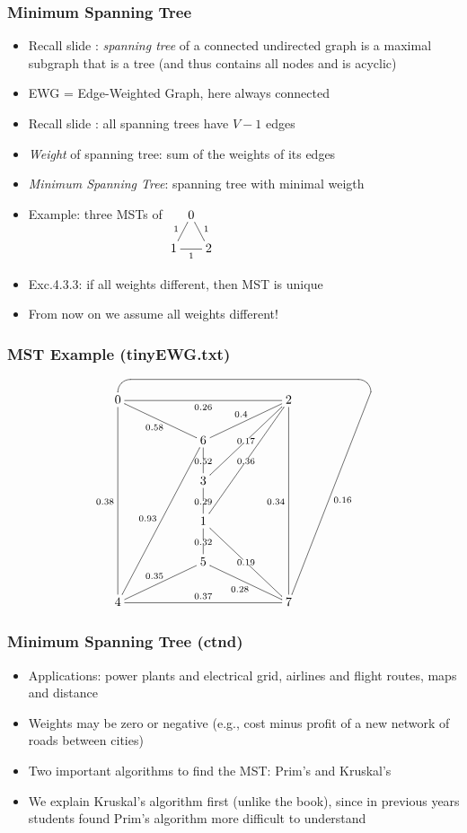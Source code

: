 \documentclass[handout]{beamer}
\begin{document}
\begin{frame}
    \frametitle{Minimum Spanning Tree}

\begin{itemize}[<+->]
\item Recall slide \hyperlink{tree_forest}{\color{red}{\pageref{tree_forest}}}: 
\emph{spanning tree} of a connected undirected graph
is a maximal subgraph that is a tree (and thus contains all nodes and is acyclic)
\item EWG = Edge-Weighted Graph, here always connected
\item Recall slide \hyperlink{tree_characteristics}{\color{red}{\pageref{tree_characteristics}}}:
all spanning trees have $V-1$ edges
\item \emph{Weight} of spanning tree: sum of the weights of its edges
\item \emph{Minimum Spanning Tree}: spanning tree with minimal weigth
\item Example: three MSTs of $\xymatrix@R=.5cm@C=.1cm{
&0 \ar@{-}[ld]_1\ar@{-}[rd]^1&\\
1 \ar@{-}[rr]_1&&2}$
\item Exc.4.3.3: if all weights different, then MST is unique
\item From now on we assume all weights different!
\end{itemize} 
\end{frame}

\begin{frame}
    \frametitle{MST Example (tinyEWG.txt)}
\[
\xymatrix@R=0.7cm@C=2cm{
0 \ar@{-} `u/10pt[rrr] `/10pt[rrr] [rrddddd]^{0.16}
\ar@{-}[ddddd]_{0.38}\ar@{-}[rr]_{0.26}&&2\ar@{-}[ddddd]_{0.34}&\\
  &6\ar@{-}[ru]^{0.4}\ar@{-}[lu]^{0.58}&&\\
  &3\ar@{-}[u]|{0.52}\ar@{-}[ruu]|{0.17}&&\\
  &1\ar@{-}[u]|{0.29}\ar@{-}[rdd]|{0.19}\ar@{-}[ruuu]|{0.36}&&\\
  &5\ar@{-}[rd]_{0.28}\ar@{-}[u]|{0.32}&&\\
4\ar@{-}[rr]^{0.37}\ar@{-}[ru]^{0.35}\ar@{-}[ruuuu]^{0.93}&& 7&\\
}
\]
\end{frame}

\begin{frame}
    \frametitle{Minimum Spanning Tree (ctnd)}

\begin{itemize}[<+->]
\item Applications: power plants and electrical grid, 
airlines and flight routes, maps and distance
\item Weights may be zero or negative (e.g., cost minus profit of a new network of roads between cities)
\item Two important algorithms to find the MST: Prim's and Kruskal's
\item We explain Kruskal's algorithm first (unlike the book), since in previous years
students found Prim's algorithm more difficult to understand
\end{itemize} 
\end{frame}
\end{document}

